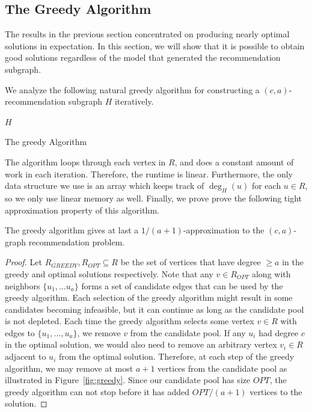 \subsection{The Greedy Algorithm}
\label{greedy}
The results in the previous section concentrated on producing nearly
optimal solutions in expectation. In this section, we will show that
it is possible to obtain good solutions regardless of the model that
generated the recommendation subgraph. \vs

We analyze the following natural greedy algorithm for constructing a $(c,a)$-recommendation
subgraph $H$ iteratively. \vspace{0.05in}

\begin{algorithm}[H]
  \SetAlgoLined
  \Return $H$\;
  \caption{The greedy Algorithm}
\end{algorithm}\vs

The algorithm loops through each vertex in $R$, and does a constant amount
of work in each iteration. Therefore, the runtime is linear. Furthermore,
the only data structure we use is an array which keeps track of $\deg_H(u)$
for each $u\in R$, so we only use linear memory as well. Finally, we prove
prove the following tight approximation property of this algorithm.

\begin{thm}
The greedy algorithm gives at last a $1/(a+1)$-approximation to the $(c,a)$-graph
recommendation problem.
\end{thm}
\begin{proof}
Let $R_{GREEDY}, R_{OPT}\subseteq R$ be the set of vertices that have
degree $\geq a$ in the greedy and optimal solutions respectively. Note
that any $v \in R_{OPT}$ along with neighbors $\{u_1,\ldots u_a\}$
forms a set of candidate edges that can be used by the greedy
algorithm.
Each selection of the greedy algorithm might result in
some candidates becoming infeasible, but it can continue as long as the candidate pool is not depleted.
Each time the greedy algorithm selects some vertex $v\in
R$ with edges to $\{u_1,\ldots, u_a\}$, we remove $v$ from the candidate pool.
If any $u_i$ had degree $c$ in the optimal solution, we would also need to
remove an arbitrary vertex $v_i\in R$ adjacent to $u_i$ from the optimal
solution.
Therefore, at each step of
the greedy algorithm, we may remove at most $a+1$ vertices from
the candidate pool as illustrated in Figure~\ref{fig:greedy}. Since our candidate pool has size $OPT$, the
greedy algorithm can not stop before it has added $OPT/(a+1)$
vertices to the solution.
\end{proof}


